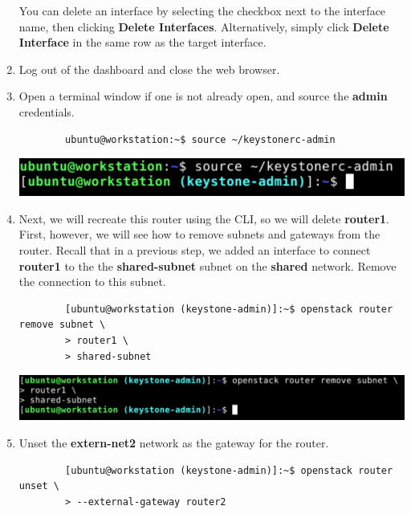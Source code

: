\documentclass[letterpaper, 12pt]{article}
\begin{document}
\begin{enumerate}
    \begin{tipbox}
        You can delete an interface by selecting the checkbox next to the interface name, then clicking \textbf{Delete
        Interfaces}. Alternatively, simply click \textbf{Delete Interface} in the same row as the target interface.
    \end{tipbox}

    \item Log out of the dashboard and close the web browser.
    
    \item Open a terminal window if one is not already open, and source the \textbf{admin} credentials.
    \begin{lstlisting}
        ubuntu@workstation:~$ source ~/keystonerc-admin
    \end{lstlisting}

    \begin{center}
        \includegraphics[width=\linewidth]{images/part2/step8.png}
    \end{center}

    \item Next, we will recreate this router using the CLI, so we will delete \textbf{router1}. First, however, we will
    see how to remove subnets and gateways from the router. Recall that in a previous step, we added an interface to
    connect \textbf{router1} to the the \textbf{shared-subnet} subnet on the \textbf{shared} network. Remove the
    connection to this subnet.
    \begin{lstlisting}
        [ubuntu@workstation (keystone-admin)]:~$ openstack router remove subnet \
        > router1 \
        > shared-subnet
    \end{lstlisting}

    \begin{center}
        \includegraphics[width=\linewidth]{images/part2/step9.png}
    \end{center}

    \item Unset the \textbf{extern-net2} network as the gateway for the router.
    \begin{lstlisting}
        [ubuntu@workstation (keystone-admin)]:~$ openstack router unset \
        > --external-gateway router2
    \end{lstlisting}


\end{enumerate}
\end{document}
